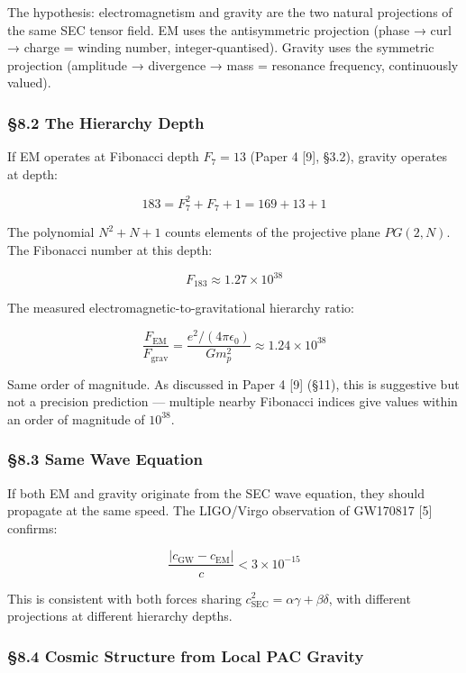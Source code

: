 \documentclass[
  11pt,
  a4paper]{article}
\begin{document}
The hypothesis: electromagnetism and gravity are the two natural
projections of the same SEC tensor field. EM uses the antisymmetric
projection (phase → curl → charge = winding number, integer-quantised).
Gravity uses the symmetric projection (amplitude → divergence → mass =
resonance frequency, continuously valued).

\subsubsection{§8.2 The Hierarchy Depth}\label{the-hierarchy-depth}

If EM operates at Fibonacci depth \(F_7 = 13\) (Paper 4 {[}9{]}, §3.2),
gravity operates at depth:

\[183 = F_7^2 + F_7 + 1 = 169 + 13 + 1\]

The polynomial \(N^2 + N + 1\) counts elements of the projective plane
\(PG(2, N)\). The Fibonacci number at this depth:

\[F_{183} \approx 1.27 \times 10^{38}\]

The measured electromagnetic-to-gravitational hierarchy ratio:

\[\frac{F_\text{EM}}{F_\text{grav}} = \frac{e^2/(4\pi\epsilon_0)}{Gm_p^2} \approx 1.24 \times 10^{38}\]

Same order of magnitude. As discussed in Paper 4 {[}9{]} (§11), this is
suggestive but not a precision prediction --- multiple nearby Fibonacci
indices give values within an order of magnitude of \(10^{38}\).

\subsubsection{§8.3 Same Wave Equation}\label{same-wave-equation}

If both EM and gravity originate from the SEC wave equation, they should
propagate at the same speed. The LIGO/Virgo observation of GW170817
{[}5{]} confirms:

\[\frac{|c_\text{GW} - c_\text{EM}|}{c} < 3 \times 10^{-15}\]

This is consistent with both forces sharing
\(c_\text{SEC}^2 = \alpha\gamma + \beta\delta\), with different
projections at different hierarchy depths.

\subsubsection{§8.4 Cosmic Structure from Local PAC
Gravity}\label{cosmic-structure-from-local-pac-gravity}
\end{document}
